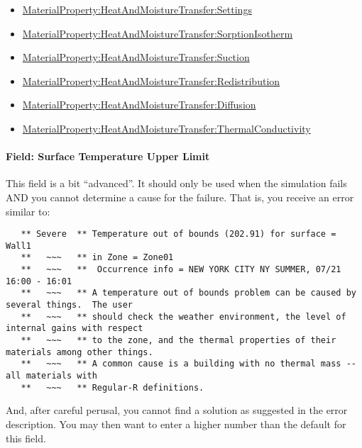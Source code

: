 \begin{itemize}
    \begin{itemize}
        \item
        \hyperref[materialpropertyheatandmoisturetransfersettings]{MaterialProperty:HeatAndMoistureTransfer:Settings}
        \item
        \hyperref[materialpropertyheatandmoisturetransfersorptionisotherm]{MaterialProperty:HeatAndMoistureTransfer:SorptionIsotherm}
        \item
        \hyperref[materialpropertyheatandmoisturetransfersuction]{MaterialProperty:HeatAndMoistureTransfer:Suction}
        \item
        \hyperref[materialpropertyheatandmoisturetransferredistribution]{MaterialProperty:HeatAndMoistureTransfer:Redistribution}
        \item
        \hyperref[materialpropertyheatandmoisturetransferdiffusion]{MaterialProperty:HeatAndMoistureTransfer:Diffusion}
        \item
        \hyperref[materialpropertyheatandmoisturetransferthermalconductivity]{MaterialProperty:HeatAndMoistureTransfer:ThermalConductivity}
    \end{itemize}
\end{itemize}

\paragraph{Field: Surface Temperature Upper Limit}\label{field-surface-temperature-upper-limit}

This field is a bit ``advanced''. It should only be used when the simulation fails AND you cannot determine a cause for the failure. That is, you receive an error similar to:

\begin{lstlisting}
   ** Severe  ** Temperature out of bounds (202.91) for surface = Wall1
   **   ~~~   ** in Zone = Zone01
   **   ~~~   **  Occurrence info = NEW YORK CITY NY SUMMER, 07/21 16:00 - 16:01
   **   ~~~   ** A temperature out of bounds problem can be caused by several things.  The user
   **   ~~~   ** should check the weather environment, the level of internal gains with respect
   **   ~~~   ** to the zone, and the thermal properties of their materials among other things.
   **   ~~~   ** A common cause is a building with no thermal mass -- all materials with
   **   ~~~   ** Regular-R definitions.
\end{lstlisting}

And, after careful perusal, you cannot find a solution as suggested in the error description. You may then want to enter a higher number than the default for this field.


